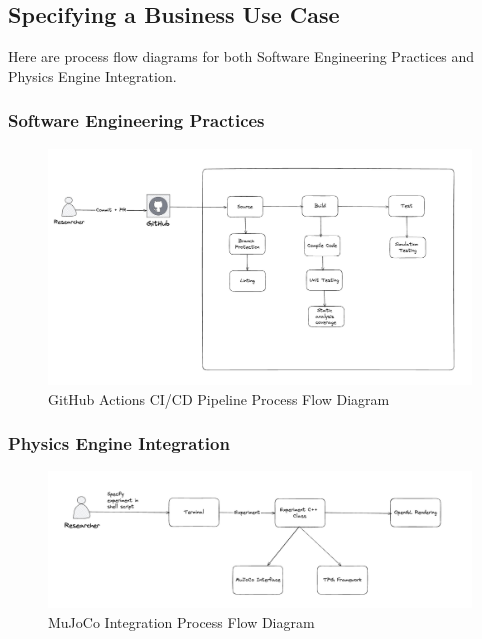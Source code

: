 \documentclass[12pt]{article}
\begin{document}
\subsection{Specifying a Business Use Case}
Here are process flow diagrams for both Software Engineering Practices and Physics Engine Integration.

\subsubsection{Software Engineering Practices}
\begin{figure}[ht!]
  \begin{center}
   \includegraphics[scale=0.5]{GithubActionsProcessFlow.png}
  \caption{GitHub Actions CI/CD Pipeline Process Flow Diagram}
  \label{Fig_ActionsProcessFlow} 
  \end{center}
\end{figure}

\clearpage

\subsubsection{Physics Engine Integration}

\begin{figure}[ht!]
  \begin{center}
   \includegraphics[scale=0.5]{MuJoCoProcessFlow.png}
  \caption{MuJoCo Integration Process Flow Diagram}
  \label{Fig_MuJoCoProcessFlow} 
  \end{center}
\end{figure}
\end{document}
